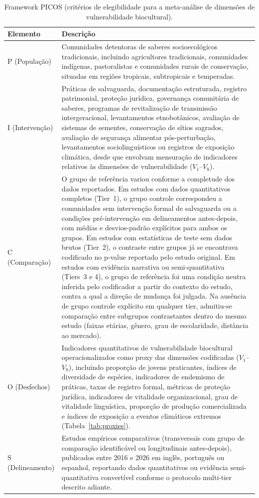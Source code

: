 \documentclass[12pt,a4paper]{article}
\begin{document}
\begin{table}[htbp]
\caption{Framework PICOS (critérios de elegibilidade para a meta-análise de dimensões de vulnerabilidade biocultural).}
\label{tab:picos}
\centering
\footnotesize
\begin{tabular}{p{3.5cm} p{9.5cm}}
\toprule
\textbf{Elemento} & \textbf{Descrição} \\
\midrule
P (População) & Comunidades detentoras de saberes socioecológicos tradicionais, incluindo agricultores tradicionais, comunidades indígenas, pastoralistas e comunidades rurais de conservação, situadas em regiões tropicais, subtropicais e temperadas. \\
I (Intervenção) & Práticas de salvaguarda, documentação estruturada, registro patrimonial, proteção jurídica, governança comunitária de saberes, programas de revitalização de transmissão intergeracional, levantamentos etnobotânicos, avaliação de sistemas de sementes, conservação de sítios sagrados, avaliação de segurança alimentar pós-perturbação, levantamentos sociolinguísticos ou registros de exposição climática, desde que envolvam mensuração de indicadores relativos às dimensões de vulnerabilidade ($V_1$--$V_8$). \\
C (Comparação) & O grupo de referência variou conforme a completude dos dados reportados. Em estudos com dados quantitativos completos (Tier~1), o grupo controle correspondeu a comunidades sem intervenção formal de salvaguarda ou a condições pré-intervenção em delineamentos antes-depois, com médias e desvios-padrão explícitos para ambos os grupos. Em estudos com estatísticas de teste sem dados brutos (Tier~2), o contraste entre grupos já se encontrava codificado no p-value reportado pelo estudo original. Em estudos com evidência narrativa ou semi-quantitativa (Tiers~3 e 4), o grupo de referência foi uma condição neutra inferida pelo codificador a partir do contexto do estudo, contra a qual a direção de mudança foi julgada. Na ausência de grupo controle explícito em qualquer tier, admitiu-se comparação entre subgrupos contrastantes dentro do mesmo estudo (faixas etárias, gênero, grau de escolaridade, distância ao mercado). \\
O (Desfechos) & Indicadores quantitativos de vulnerabilidade biocultural operacionalizados como proxy das dimensões codificadas ($V_1$--$V_8$), incluindo proporção de jovens praticantes, índices de diversidade de espécies, indicadores de endemismo de práticas, taxas de registro formal, métricas de proteção jurídica, indicadores de vitalidade organizacional, grau de vitalidade linguística, proporção de produção comercializada e índices de exposição a eventos climáticos extremos (Tabela~\ref{tab:proxies}). \\
S (Delineamento) & Estudos empíricos comparativos (transversais com grupo de comparação identificável ou longitudinais antes-depois), publicados entre 2016 e 2026 em inglês, português ou espanhol, reportando dados quantitativos ou evidência semi-quantitativa convertível conforme o protocolo multi-tier descrito adiante. \\
\bottomrule
\end{tabular}
\end{table}
\end{document}
